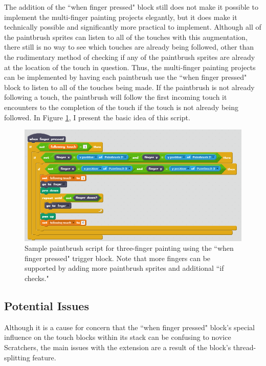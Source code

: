 The addition of the ``when finger pressed" block still does not make it possible to implement the multi-finger painting projects elegantly, but it does make it technically possible and significantly more practical to implement. Although all of the paintbrush sprites can listen to all of the touches with this augmentation, there still is no way to see which touches are already being followed, other than the rudimentary method of checking if any of the paintbrush sprites are already at the location of the touch in question. Thus, the multi-finger painting projects can be implemented by having each paintbrush use the ``when finger pressed" block to listen to all of the touches being made. If the paintbrush is not already following a touch, the paintbrush will follow the first incoming touch it encounters to the completion of the touch if the touch is not already being followed. In Figure \ref{MultiFingerPaintingCFD}, I present the basic idea of this script.

\begin{figure}
\centering
\includegraphics[width=1.0\textwidth]{images/MultiFingerPaintingCFD.PNG}
\caption[Sample Script for Multi-Finger Painting Using the Closest Finger Design Extension]{Sample paintbrush script for three-finger painting using the ``when finger pressed" trigger block. Note that more fingers can be supported by adding more paintbrush sprites and additional ``if checks."}
\label{MultiFingerPaintingCFD}
\end{figure}

\subsection{Potential Issues}
Although it is a cause for concern that the ``when finger pressed" block's special influence on the touch blocks within its stack can be confusing to novice Scratchers, the main issues with the extension are a result of the block's thread-splitting feature.

